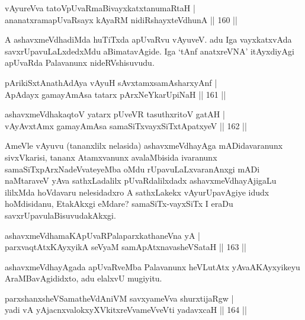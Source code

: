 
\begin{shl}
vAyureVva tatoV\s pUvaRmaBivayxkatxtanumaRtaH |\\
ananatxramapUvaRsayx kAyaRM nidiRshayxteV\s dhunA \hfill || 160 ||
\end{shl}

\begin{artha}
A ashavxmeVdhadiMda huTiTxda apUvaRvu vAyuveV. adu Iga vayxkatxvAda savxrUpavuLaLxdedxMdu aBimatavAgide. Iga `tAnf anatxreVNA' itAyxdiyAgi apUvaRda Palavanunx nideRVshisuvudu.
\end{artha}

\begin{shl}
pArikiSxtAnathA\s \s dAya vAyuH sAvxtamxsamAsharxyAnf |\\
ApAdayx gamayAmAsa tatarx pArxNeYkarUpiNaH \hfill || 161 ||
\end{shl}


\begin{shl}
ashavxmeVdhakaqtoV yatarx pUveVR tasuthxritoV gatAH |\\
vAyAvxtAmx gamayAmAsa samaSiTxvayxSiTxtApatxyeV \hfill || 162 ||
\end{shl}

\begin{artha}
AmeVle vAyuvu (tananxlilx nelasida) ashavxmeVdhayAga mADidavaranunx sivxVkarisi, tananx Atamxvanunx avalaMbisida ivaranunx samaSiTxpArxNadeVvateyeMba oMdu rUpavuLaLxvaranAnxgi mADi naMtaraveV yAva sathxLadalilx pUvaRdalilxdadx ashavxmeVdhayAjigaLu ililxMda hoVdavaru nelesidadxro A sathxLakekx vAyurUpavAgiye idudx hoMdisidanu, EtakAkxgi eMdare? samaSiTx-vayxSiTx I eraDu savxrUpavu\break laBisuvudakAkxgi.
\end{artha}

\begin{shl}
ashavxmeVdhamaKApUvaRPalaparxkathaneVna yA |\\
parxvaqtAtx\s \s KAyxyikA seVyaM samApAtx\s navasheVSataH \hfill || 163 ||
\end{shl}

\begin{artha}
ashavxmeVdhayAgada apUvaRveMba Palavanunx heVLutAtx yAva\break AKAyxyikeyu AraMBavAgididxto, adu elalxvU mugiyitu.
\end{artha}

\begin{shl}
parxshanxsheVSamatheVdAniVM savxyameVva shurxtijaRgw |\\
yadi vA yAjacnxvalokxyXVkitxreVvameVveVti yadavxcaH \hfill || 164 ||
\end{shl}

